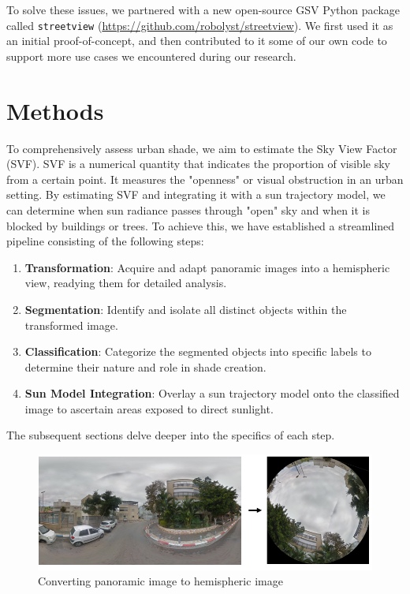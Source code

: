 \documentclass[nohyperref]{article}
\theoremstyle{plain}
\theoremstyle{definition}
\theoremstyle{remark}
\begin{document}
To solve these issues, we partnered with a new open-source GSV Python package called \texttt{streetview} (\url{https://github.com/robolyst/streetview}). We first used it as an initial proof-of-concept, and then contributed to it some of our own code to support more use cases we encountered during our research.

\section{Methods}
\label{methods}
To comprehensively assess urban shade, we aim to estimate the Sky View Factor (SVF). SVF is a numerical quantity that indicates the proportion of visible sky from a certain point. It measures the "openness" or visual obstruction in an urban setting. By estimating SVF and integrating it with a sun trajectory model, we can determine when sun radiance passes through "open" sky and when it is blocked by buildings or trees. To achieve this, we have established a streamlined pipeline consisting of the following steps:

\begin{enumerate}
    \item \textbf{Transformation}: Acquire and adapt panoramic images into a hemispheric view, readying them for detailed analysis.
    
    \item \textbf{Segmentation}: Identify and isolate all distinct objects within the transformed image.
    
    \item \textbf{Classification}: Categorize the segmented objects into specific labels to determine their nature and role in shade creation.
    
    \item \textbf{Sun Model Integration}: Overlay a sun trajectory model onto the classified image to ascertain areas exposed to direct sunlight.
\end{enumerate}

The subsequent sections delve deeper into the specifics of each step.

\begin{figure}[ht]
\begin{center}
\centerline{\includegraphics[width=\columnwidth]{pipeline-1.png}}
\caption{Converting panoramic image to hemispheric image}
\end{center}
\vskip -0.2in
\end{figure}
\end{document}
